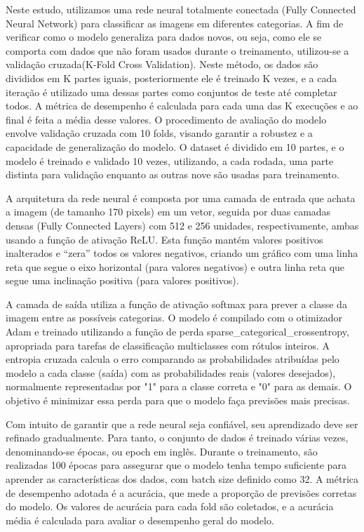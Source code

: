 Neste estudo, utilizamos uma rede neural totalmente conectada (Fully Connected Neural Network) para classificar as imagens em diferentes categorias. A fim de verificar como o modelo generaliza para dados novos, ou seja, como ele se comporta com dados que não foram usados durante o treinamento, utilizou-se a validação cruzada(K-Fold Cross Validation). Neste método, os dados são divididos em K partes iguais, posteriormente ele é treinado K vezes, e a cada iteração é utilizado uma dessas partes como conjuntos de teste até completar todos. A métrica de desempenho é calculada para cada uma das K execuções e ao final é feita a média desse valores. \cite{tensorflow_training_loop_from_scratch}
O procedimento de avaliação do modelo envolve validação cruzada  com 10 folds, visando garantir a robustez e a capacidade de generalização do modelo. O dataset é dividido em 10 partes, e o modelo é treinado e validado 10 vezes, utilizando, a cada rodada, uma parte distinta para validação enquanto as outras nove são usadas para treinamento.

A arquitetura da rede neural é composta por uma camada de entrada que achata a imagem (de tamanho 170  pixels) em um vetor, seguida por duas camadas densas (Fully Connected Layers) com 512 e 256 unidades, respectivamente, ambas usando a função de ativação ReLU. Esta função mantém valores positivos inalterados e “zera” todos os valores negativos, criando um gráfico com uma linha reta que segue o eixo horizontal (para valores negativos) e outra linha reta que segue uma inclinação positiva (para valores positivos).\cite{tensorflow_relu_activation}

A camada de saída utiliza a função de ativação softmax para prever a classe da imagem entre as possíveis categorias. O modelo é compilado com o otimizador Adam e treinado utilizando a função de perda sparse\_categorical\_crossentropy, apropriada para tarefas de classificação multiclasses com rótulos inteiros. A entropia cruzada calcula o erro comparando as probabilidades atribuídas pelo modelo a cada classe (saída) com as probabilidades reais (valores desejados), normalmente representadas por "1" para a classe correta e "0" para as demais. O objetivo é minimizar essa perda para que o modelo faça previsões mais precisas.\cite{tensorflow_sparse_categorical_crossentropy}

Com intuito de garantir que a rede neural seja confiável, seu aprendizado deve ser refinado gradualmente. Para tanto, o conjunto de dados é treinado várias vezes, denominando-se épocas, ou epoch em inglês. Durante o treinamento, são realizadas 100 épocas para assegurar que o modelo tenha tempo suficiente para aprender as características dos dados, com batch size definido como 32. A métrica de desempenho adotada é a acurácia, que mede a proporção de previsões corretas do modelo. Os valores de acurácia para cada fold são coletados, e a acurácia média é calculada para avaliar o desempenho geral do modelo.\cite{tensorflow_training_loop_from_scratch}

